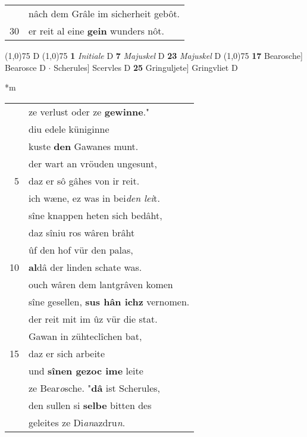 \documentclass[8pt,a4paper,notitlepage]{article}
\begin{document}
\begin{table}[ht]
\begin{minipage}[t]{0.5\linewidth}
\begin{tabular}{rl}
 & nâch dem Grâle im sicherheit gebôt.\\ 
30 & er reit al eine \textbf{gein} wunders nôt.\\ 
\end{tabular}
\scriptsize
\line(1,0){75} \newline
D \newline
\line(1,0){75} \newline
\textbf{1} \textit{Initiale} D  \textbf{7} \textit{Majuskel} D  \textbf{23} \textit{Majuskel} D  \newline
\line(1,0){75} \newline
\textbf{17} Bearosche] Bearosce D  $\cdot$ Scherules] Scervles D \textbf{25} Gringuljete] Gringvliet D \newline
\end{minipage}
\hspace{0.5cm}
\begin{minipage}[t]{0.5\linewidth}
\small
\begin{center}*m
\end{center}
\begin{tabular}{rl}
 & ze verlust oder ze \textbf{gewinne}."\\ 
 & diu edele küniginne\\ 
 & kuste \textbf{den} Gawanes munt.\\ 
 & der wart an vröuden ungesunt,\\ 
5 & daz er sô gâhes von ir reit.\\ 
 & ich wæne, ez was in bei\textit{den lei}t.\\ 
 & sîne knappen heten sich bedâht,\\ 
 & daz sîniu ros wâren brâht\\ 
 & ûf den hof vür den palas,\\ 
10 & \textbf{al}dâ der linden schate was.\\ 
 & ouch wâren dem lantgrâven komen\\ 
 & sîne gesellen, \textbf{sus hân ichz} vernomen.\\ 
 & der reit mit im ûz vür die stat.\\ 
 & Gawan in zühteclîchen bat,\\ 
15 & daz er sich arbeite\\ 
 & und \textbf{sînen gezoc ime} leite\\ 
 & ze Bear\textit{o}sche. "\textbf{dâ} ist Scherules,\\ 
 & den sullen si \textbf{selbe} bitten des\\ 
 & geleites ze Di\textit{an}azdru\textit{n}.\\ 

\end{tabular}
\end{minipage}
\end{table}
\end{document}
